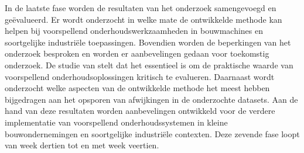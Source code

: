 In de laatste fase worden de resultaten van het onderzoek samengevoegd en geëvalueerd. Er wordt onderzocht in welke mate de ontwikkelde methode kan helpen bij voorspellend onderhoudswerkzaamheden in bouwmachines en soortgelijke industriële toepassingen. Bovendien worden de beperkingen van het onderzoek besproken en worden er aanbevelingen gedaan voor toekomstig onderzoek. De studie van \textcite{Nayak2024} stelt dat het essentieel is om de praktische waarde van voorspellend onderhoudsoplossingen kritisch te evalueren. Daarnaast wordt onderzocht welke aspecten van de ontwikkelde methode het meest hebben bijgedragen aan het opsporen van afwijkingen in de onderzochte datasets. Aan de hand van deze resultaten worden aanbevelingen ontwikkeld voor de verdere implementatie van voorspellend onderhoudssystemen in kleine bouwondernemingen en soortgelijke industriële contexten. Deze zevende fase loopt van week dertien tot en met week veertien.




